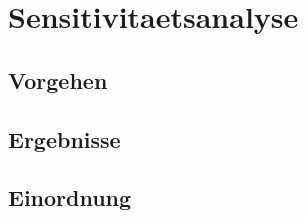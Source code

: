 \section{Sensitivitaetsanalyse}
\label{sec:sensitivitaet}


\subsection{Vorgehen}


\subsection{Ergebnisse}

\subsection{Einordnung}

